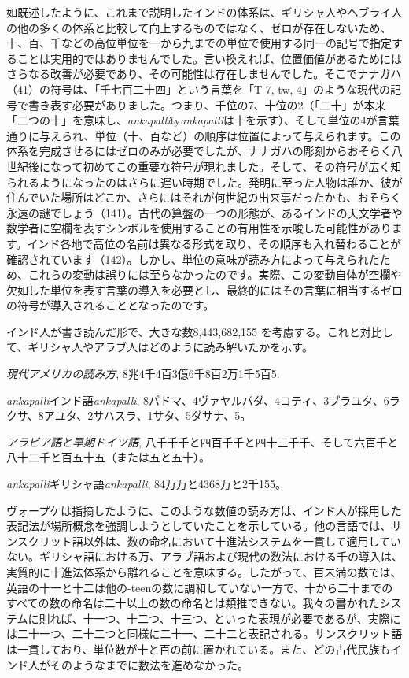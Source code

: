 \documentclass[a4paper,11pt,openany]{ltjsbook}
\begin{document}
如既述したように、これまで説明したインドの体系は、ギリシャ人やヘブライ人の他の多くの体系と比較して向上するものではなく、ゼロが存在しないため、十、百、千などの高位単位を一から九までの単位で使用する同一の記号で指定することは実用的ではありませんでした。言い換えれば、位置価値があるためにはさらなる改善が必要であり、その可能性は存在しませんでした。そこでナナガハ（41）の符号は、「千七百二十四」という言葉を「T 7, tw, 4」のような現代の記号で書き表す必要がありました。つまり、千位の7、十位の2（「二十」が本来「二つの十」を意味し、\textit{ankapalli}ty\textit{ankapalli}は十を示す）、そして単位の4が言葉通りに与えられ、単位（十、百など）の順序は位置によって与えられます。この体系を完成させるにはゼロのみが必要でしたが、ナナガハの彫刻からおそらく八世紀後になって初めてこの重要な符号が現れました。そして、その符号が広く知られるようになったのはさらに遅い時期でした。発明に至った人物は誰か、彼が住んでいた場所はどこか、さらにはそれが何世紀の出来事だったかも、おそらく永遠の謎でしょう（141）。古代の算盤の一つの形態が、あるインドの天文学者や数学者に空欄を表すシンボルを使用することの有用性を示唆した可能性があります。インド各地で高位の名前は異なる形式を取り、その順序も入れ替わることが確認されています（142）。しかし、単位の意味が読み方によって与えられたため、これらの変動は誤りには至らなかったのです。実際、この変動自体が空欄や欠如した単位を表す言葉の導入を必要とし、最終的にはその言葉に相当するゼロの符号が導入されることとなったのです。

インド人が書き読んだ形で、大きな数8,443,682,155 を考慮する。これと対比して、ギリシャ人やアラブ人はどのように読み解いたかを示す。

\textit{現代アメリカの読み方}, 8兆4千4百3億6千8百2万1千5百5.

\textit{ankapalli}インド語\textit{ankapalli}, 8パドマ、4ヴァヤルバダ、4コティ、3プラユタ、6ラクサ、8アユタ、2サハスラ、1サタ、5ダサナ、5。

\textit{アラビア語と早期ドイツ語}, 八千千千と四百千千と四十三千千、そして六百千と八十二千と百五十五（または五と五十）。

\textit{ankapalli}ギリシャ語\textit{ankapalli}, 84万万と4368万と2千155。

ヴォープケは指摘したように、このような数値の読み方は、インド人が採用した表記法が場所概念を強調しようとしていたことを示している。他の言語では、サンスクリット語以外は、数の命名において十進法システムを一貫して適用していない。ギリシャ語における万、アラブ語および現代の数法における千の導入は、実質的に十進法体系から離れることを意味する。したがって、百未満の数では、英語の十一と十二は他の-teenの数に調和していない一方で、十から二十までのすべての数の命名は二十以上の数の命名とは類推できない。我々の書かれたシステムに則れば、十一つ、十二つ、十三つ、といった表現が必要であるが、実際には二十一つ、二十二つと同様に二十一、二十二と表記される。サンスクリット語は一貫しており、単位数が十と百の前に置かれている。また、どの古代民族もインド人がそのようなまでに数法を進めなかった。
\end{document}
